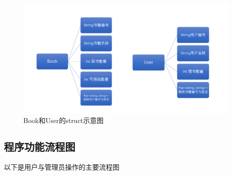 \documentclass{ctexart}
\begin{document}
    \begin{figure}[h] %
        \centering
        \includegraphics[width=1\textwidth]{src/structs.png}
        \caption{Book和User的struct示意图}    
    \end{figure}
    
    \subsection{程序功能流程图}
    以下是用户与管理员操作的主要流程图
    
\end{document}
